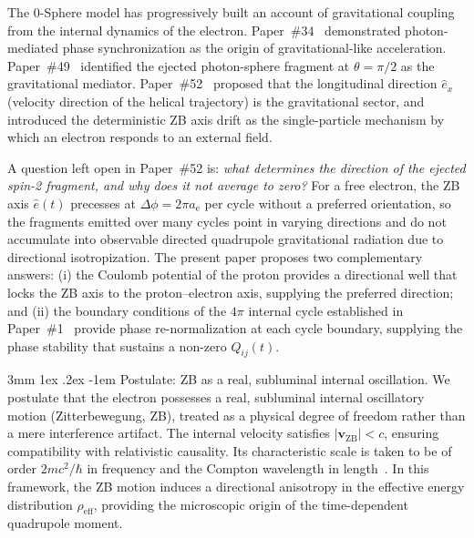 \documentclass[%
 reprint, amsmath,amssymb, aps, prd, ]{revtex4-2}
\makeatletter
\numberwithin{equation}{section}
\renewcommand\paragraph{%
  \@startsection{paragraph}{4}{\z@}%
    {3mm \@plus 1ex \@minus .2ex}%
    {-1em}%
    {\normalfont\normalsize\itshape}}
\newcommand{\iphase}{\theta}
\newcommand{\anom}{a_{\mathrm{e}}}
\newcommand{\ehat}[1]{\hat{e}_{#1}}
\makeatother
\begin{document}
The 0-Sphere model has progressively built an account of gravitational coupling from the internal dynamics of the electron.
Paper~\#34~\cite{hanamura34} demonstrated photon-mediated phase synchronization as the origin of gravitational-like acceleration.
Paper~\#49~\cite{hanamura49} identified the ejected photon-sphere fragment at $\iphase = \pi/2$ as the gravitational mediator.
Paper~\#52~\cite{hanamura52} proposed that the longitudinal direction $\ehat{x}$ (velocity direction of the helical trajectory) is the gravitational sector, and introduced the deterministic ZB axis drift as the single-particle mechanism by which an electron responds to an external field.

A question left open in Paper~\#52 is: \emph{what determines the direction of the ejected spin-2 fragment, and why does it not average to zero?}
For a free electron, the ZB axis $\hat{e}(t)$ precesses at $\Delta\phi = 2\pi\anom$ per cycle without a preferred orientation, so the fragments emitted over many cycles point in varying directions and do not accumulate into observable directed quadrupole gravitational radiation due to directional isotropization.
The present paper proposes two complementary answers: (i) the Coulomb potential of the proton provides a directional well that locks the ZB axis to the proton--electron axis, supplying the preferred direction; and (ii) the boundary conditions of the $4\pi$ internal cycle established in Paper~\#1~\cite{hanamura01} provide phase re-normalization at each cycle boundary, supplying the phase stability that sustains a non-zero $Q_{ij}(t)$.

\paragraph{Postulate: ZB as a real, subluminal internal oscillation.}
We postulate that the electron possesses a real, subluminal internal oscillatory motion (Zitterbewegung, ZB), treated as a physical degree of freedom rather than a mere interference artifact.
The internal velocity satisfies $|\mathbf{v}_{\mathrm{ZB}}| < c$, ensuring compatibility with relativistic causality.
Its characteristic scale is taken to be of order $2mc^2/\hbar$ in frequency and the Compton wavelength in length~\cite{hanamura10, Schrodinger1930}.
In this framework, the ZB motion induces a directional anisotropy in the effective energy distribution $\rho_{\mathrm{eff}}$, providing the microscopic origin of the time-dependent quadrupole moment.
\end{document}
